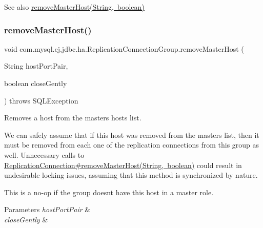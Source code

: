 \begin{DoxySeeAlso}{See also}
\mbox{\hyperlink{classcom_1_1mysql_1_1cj_1_1jdbc_1_1ha_1_1_replication_connection_group_a63d001e066840fdb7b35f01464baedb0}{remove\+Master\+Host(\+String, boolean)}} 
\end{DoxySeeAlso}
\mbox{\label{classcom_1_1mysql_1_1cj_1_1jdbc_1_1ha_1_1_replication_connection_group_a63d001e066840fdb7b35f01464baedb0}} 
\subsubsection{\texorpdfstring{remove\+Master\+Host()}{removeMasterHost()}\hspace{0.1cm}{\footnotesize\ttfamily [2/2]}}
{\footnotesize\ttfamily void com.\+mysql.\+cj.\+jdbc.\+ha.\+Replication\+Connection\+Group.\+remove\+Master\+Host (\begin{DoxyParamCaption}\item[{String}]{host\+Port\+Pair,  }\item[{boolean}]{close\+Gently }\end{DoxyParamCaption}) throws S\+Q\+L\+Exception}

Removes a host from the masters hosts list.

We can safely assume that if this host was removed from the masters list, then it must be removed from each one of the replication connections from this group as well. Unnecessary calls to \mbox{\hyperlink{}{Replication\+Connection\#remove\+Master\+Host(\+String, boolean)}} could result in undesirable locking issues, assuming that this method is synchronized by nature.

This is a no-\/op if the group doesn\textquotesingle{}t have this host in a master role.


\begin{DoxyParams}{Parameters}
{\em host\+Port\+Pair} & \\
\hline
{\em close\+Gently} & \\
\hline
\end{DoxyParams}

